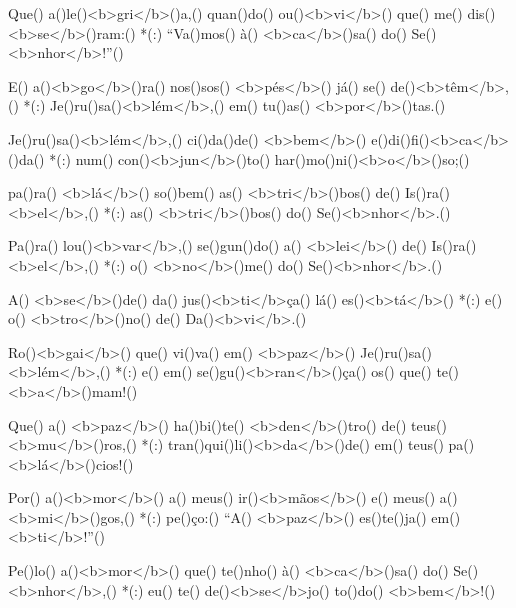 Que() a()le()<b>gri</b>()a,() quan()do() ou()<b>vi</b>() que() me() dis()<b>se</b>()ram:() *(:)
``Va()mos() à() <b>ca</b>()sa() do() Se()<b>nhor</b>!''()

E() a()<b>go</b>()ra() nos()sos() <b>pés</b>() já() se() de()<b>têm</b>,() *(:)
Je()ru()sa()<b>lém</b>,() em() tu()as() <b>por</b>()tas.()

 Je()ru()sa()<b>lém</b>,() ci()da()de() <b>bem</b>() e()di()fi()<b>ca</b>()da() *(:)
num() con()<b>jun</b>()to() har()mo()ni()<b>o</b>()so;()

pa()ra() <b>lá</b>() so()bem() as() <b>tri</b>()bos() de() Is()ra()<b>el</b>,() *(:)
as() <b>tri</b>()bos() do() Se()<b>nhor</b>.()

Pa()ra() lou()<b>var</b>,() se()gun()do() a() <b>lei</b>() de() Is()ra()<b>el</b>,() *(:)
o() <b>no</b>()me() do() Se()<b>nhor</b>.()

 A() <b>se</b>()de() da() jus()<b>ti</b>ça() lá() es()<b>tá</b>() *(:)
e() o() <b>tro</b>()no() de() Da()<b>vi</b>.()

 Ro()<b>gai</b>() que() vi()va() em() <b>paz</b>() Je()ru()sa()<b>lém</b>,() *(:)
e() em() se()gu()<b>ran</b>()ça() os() que() te() <b>a</b>()mam!()

 Que() a() <b>paz</b>() ha()bi()te() <b>den</b>()tro() de() teus() <b>mu</b>()ros,() *(:)
tran()qui()li()<b>da</b>()de() em() teus() pa()<b>lá</b>()cios!()

 Por() a()<b>mor</b>() a() meus() ir()<b>mãos</b>() e() meus() a()<b>mi</b>()gos,() *(:)
pe()ço:() ``A() <b>paz</b>() es()te()ja() em() <b>ti</b>!''()

 Pe()lo() a()<b>mor</b>() que() te()nho() à() <b>ca</b>()sa() do() Se()<b>nhor</b>,() *(:)
eu() te() de()<b>se</b>jo() to()do() <b>bem</b>!()